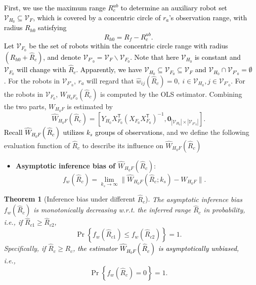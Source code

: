 \documentclass[12pt,journal,draftclsnofoot,onecolumn]{IEEEtran}
\newtheorem{theorem}{Theorem}
\let \sss=\scriptscriptstyle
\begin{document}
\textcolor{black}{First, we use the maximum range $R_c^{ub}$ to determine an auxiliary robot set $\mathcal{V}_{\sss H_0}\subseteq \mathcal{V}_{\sss F}$, which is covered by a concentric circle of $r_a$'s observation range, with radius $R_{h0}$ satisfying
\begin{equation}
R_{h0}=R_f-R_c^{ub}. 
\end{equation} 
Let $\mathcal{V}_{\sss F_0}$ be the set of robots within the concentric circle range with radius $(R_{h0}+\hat{R}_{c})$, and denote $\mathcal{V}_{\sss F'_0}=\mathcal{V}_{\sss F}\backslash\mathcal{V}_{\sss F_0}$. 
Note that here $\mathcal{V}_{\sss H_0}$ is constant and $\mathcal{V}_{\sss F_0}$ will change with $\hat{R}_{c}$. 
Apparently, we have $\mathcal{V}_{\sss H_0}\!\subseteq\!\mathcal{V}_{\sss F_0}\!\subseteq \!\mathcal{V}_{\sss F}$ and $\mathcal{V}_{\sss H_0}\cap\mathcal{V}_{\sss F'_0}=\emptyset$. }
For the robots in $\mathcal{V}_{\sss F'_0}$, $r_a$ will regard that $\hat w_{ij} (\hat{R}_c)=0,~i\in\mathcal{V}_{\sss H_0},j\in\mathcal{V}_{\sss F'_0}$. 
For the robots in $\mathcal{V}_{\sss F_0}$, $\hat W_{\sss{H_0 F_0}}(\hat{R}_c)$ is computed by the OLS estimator. 
Combining the two parts, $W_{\sss{H_0 F}}$ is estimated by 
\begin{equation}\label{eq:h0f}
\hat W_{\sss{H_0 F}}(\hat{R}_c) =\left [Y_{\sss H_0} X_{\sss F_0}^\mathsf{T} ( X_{\sss F_0} X_{\sss F_0}^\mathsf{T})^{-1}, \bm{0}_{|\mathcal{V}_{\sss H_0}|\times |\mathcal{V}_{\sss F'_0}| } \right]. 
\end{equation}
\textcolor{black}{Recall $\hat W_{\sss{H_0 F}}(\hat{R}_c)$ utilizes $k_s$ groups of observations}, and we define the following evaluation function of $\hat R_c$ to describe its influence on $\hat W_{\sss{H_0 F}}(\hat{R}_c)$
\begin{itemize}
\item \textbf{Asymptotic inference bias of $\hat W_{\sss{H_0 F}}(\hat{R}_c)$}:
\begin{equation}\label{eq:asymptotic-bias}
f_w(\hat{R}_c)=  \mathop {\lim } \limits_{ k_s \to \infty } \| \hat W_{\sss{H_0 F}}(\hat{R}_c;k_s)  - W_{\sss{H_0 F}}  \|.  
\end{equation}
\end{itemize}



\begin{theorem}[Inference bias under different $\hat{R}_c$]\label{th:decreasing-error}
The asymptotic inference bias $f_w(\hat{R}_c)$ is monotonically decreasing w.r.t. the inferred range $\hat{R}_c$ in probability, i.e., if $\hat{R}_{c1}\ge \hat{R}_{c2}$, 
\begin{equation}\label{eq:fw-le}
\Pr \left\{ f_w(\hat{R}_{c1}) \le f_w(\hat{R}_{c2}) \right\}=1. 
\end{equation}
Specifically, if $\hat{R}_c\ge R_c$, \textcolor{black}{the estimator $\hat W_{\sss{H_0 F}}(\hat{R}_c)$ is asymptotically unbiased}, i.e., 
\begin{equation}
\Pr \left\{ f_w(\hat{R}_c)=0 \right\}=1. 
\end{equation}
\end{theorem}
\end{document}
